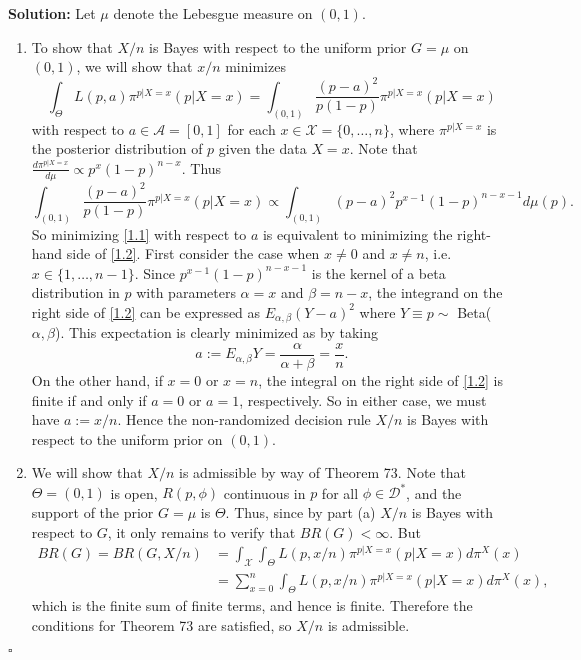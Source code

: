 \documentclass[12pt]{article}
\newcounter{ProofCounter}
\newenvironment{Solution}{\stepcounter{ProofCounter}\textbf{Solution:}}{\hfill$\square$}
\begin{document}
\begin{Solution}
  Let $\mu$ denote the Lebesgue measure on $(0,1)$.
  \begin{enumerate}[label=(\alph*), leftmargin=6mm]
    \item To show that $X / n$ is Bayes with respect to the uniform prior $G = \mu$ on $(0,1)$, we will show that $x / n$ minimizes
      \begin{equation}
        \int_{\Theta}L(p,a) \pi^{p|X=x}(p|X=x) = \int_{(0,1)} \frac{(p-a)^2}{p(1-p)}\pi^{p|X=x}(p|X=x)
        \label{1.1}
      \end{equation}
      with respect to $a \in \mathcal{A} = [0,1]$ for each $x \in \mathcal{X} = \{0, \dots, n\}$, where $\pi^{p|X=x}$ is the posterior distribution of
      $p$ given the data $X = x$. Note that $\frac{d\pi^{p|X=x}}{d\mu} \propto p^{x}(1-p)^{n-x}$. Thus
      \begin{equation}
        \int_{(0,1)} \frac{(p-a)^2}{p(1-p)}\pi^{p|X=x}(p|X=x) \propto \int_{(0,1)}(p-a)^2 p^{x-1}(1-p)^{n-x-1}d\mu(p).
        \label{1.2}
      \end{equation}
      So minimizing \eqref{1.1} with respect to $a$ is equivalent to minimizing the right-hand side of \eqref{1.2}.
      First consider the case when $x \neq 0$ and $x\neq n$, i.e. $x \in \{1, \dots, n-1\}$. Since $p^{x-1}(1-p)^{n-x-1}$ is the kernel of a beta
      distribution in $p$ with parameters $\alpha = x$ and $\beta = n-x$, the integrand on the right side of \eqref{1.2} can be expressed as 
      $E_{\alpha,\beta}(Y-a)^2$
      where $Y \equiv p \sim$ Beta($\alpha, \beta$). This expectation is clearly minimized as by taking 
      \[
        a := E_{\alpha,\beta}Y = \frac{\alpha}{\alpha + \beta} = \frac{x}{n}.
      \]
      On the other hand, if $x = 0$ or $x = n$, the integral on the right side of \eqref{1.2} is finite if and only if $a = 0$ or $a = 1$,
      respectively. So in either case, we must have $a := x / n$. Hence the non-randomized decision rule $X / n$ is Bayes with respect to the uniform
      prior on $(0,1)$.

    \item We will show that $X / n$ is admissible by way of Theorem 73. Note that $\Theta = (0,1)$ is open, $R(p, \phi)$ continuous in $p$ for all $\phi
      \in \mathcal{D}^*$, and the support of the prior $G = \mu$ is $\Theta$. Thus, since by part (a) $X / n$ is Bayes with respect to 
      $G$, it only remains to verify that $BR(G) < \infty$. But
      \begin{align*} 
        BR(G) = BR(G, X/n) & = \int_{\mathcal{X}} \int_{\Theta}L(p,x/n)\pi^{p|X=x}(p|X=x)d\pi^X(x) \\
        & = \sum_{x=0}^n\int_{\Theta}L(p,x/n)\pi^{p|X=x}(p|X=x)d\pi^X(x),
      \end{align*}
      which is the finite sum of finite terms, and hence is finite. Therefore the conditions for Theorem 73 are satisfied, so $X / n$ is admissible.


\end{enumerate}
\end{Solution}
\end{document}
